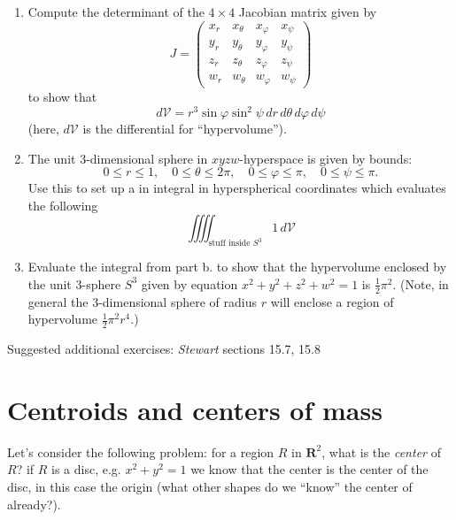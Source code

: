 \documentclass[12pt]{article}
\numberwithin{equation}{subsection}
\numberwithin{figure}{subsection}
\theoremstyle{note}
\begin{document}
{\begin{enumerate}[label=\arabic*.]
\begin{enumerate}
	\item Compute the determinant of the $4\times 4$ Jacobian matrix given by 
	\[ J=\begin{pmatrix} x_r & x_{\theta} & x_{\varphi} & x_{\psi} \\
	y_r & y_{\theta} & y_{\varphi} & y_{\psi}\\
	z_r & z_{\theta} & z_{\varphi} & z_{\psi}\\
	w_r & w_{\theta} & w_{\varphi} & w_{\psi}
	\end{pmatrix}\]
	to show that \[d\mathcal{V}= r^3 \sin \varphi  \sin^{2}\psi \, dr\, d\theta \, d\varphi \, d\psi\] (here, $d\mathcal{V}$ is the differential for ``hypervolume'').
	\item The unit $3$-dimensional sphere in $xyzw$-hyperspace is given by bounds: \[0\leq r \leq 1, \quad  0\leq \theta \leq 2\pi, \quad 0\leq \varphi \leq \pi, \quad 0\leq \psi \leq \pi.\] Use this to set up a in integral in hyperspherical coordinates which evaluates the following 
	\[ \iiiint_{\text{stuff inside $S^3$}} 1\, d\mathcal{V}\] 
	\item Evaluate the integral from part b. to show that the hypervolume enclosed by the unit 3-sphere $S^3$ given by equation $x^2+y^2+z^2+w^2=1$ is $\frac{1}{2}\pi^2$. (Note, in general the $3$-dimensional sphere of radius $r$ will enclose a region of hypervolume $\frac{1}{2}\pi^2 r^4$.)
\end{enumerate}
\end{enumerate}
Suggested additional exercises: \textit{Stewart} sections 15.7, 15.8




\section{Centroids and centers of mass}

Let's consider the following problem: for a region $R$ in $\mathbf{R}^2$, what is the \textit{center} of $R$? if $R$ is a disc, e.g. $x^2+y^2=1$ we know that the center is the center of the disc, in this case the origin (what other shapes do we ``know'' the center of already?). 

}
\end{document}
